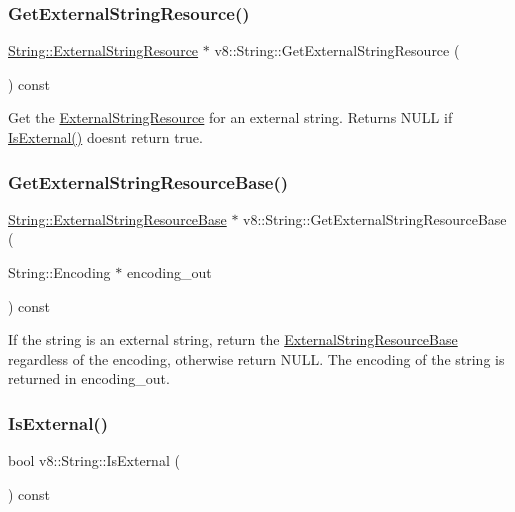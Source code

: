 \subsubsection{\texorpdfstring{Get\+External\+String\+Resource()}{GetExternalStringResource()}}
{\footnotesize\ttfamily \mbox{\hyperlink{classv8_1_1String_1_1ExternalStringResource}{String\+::\+External\+String\+Resource}} $\ast$ v8\+::\+String\+::\+Get\+External\+String\+Resource (\begin{DoxyParamCaption}{ }\end{DoxyParamCaption}) const}

Get the \mbox{\hyperlink{classv8_1_1String_1_1ExternalStringResource}{External\+String\+Resource}} for an external string. Returns N\+U\+LL if \mbox{\hyperlink{classv8_1_1String_a1d24faa97c6168221ec362c395d41ce1}{Is\+External()}} doesn\textquotesingle{}t return true. \mbox{\label{classv8_1_1String_a3031c6406f3f84bbc2d9810477a07489}} 
\subsubsection{\texorpdfstring{Get\+External\+String\+Resource\+Base()}{GetExternalStringResourceBase()}}
{\footnotesize\ttfamily \mbox{\hyperlink{classv8_1_1String_1_1ExternalStringResourceBase}{String\+::\+External\+String\+Resource\+Base}} $\ast$ v8\+::\+String\+::\+Get\+External\+String\+Resource\+Base (\begin{DoxyParamCaption}\item[{String\+::\+Encoding $\ast$}]{encoding\+\_\+out }\end{DoxyParamCaption}) const}

If the string is an external string, return the \mbox{\hyperlink{classv8_1_1String_1_1ExternalStringResourceBase}{External\+String\+Resource\+Base}} regardless of the encoding, otherwise return N\+U\+LL. The encoding of the string is returned in encoding\+\_\+out. \mbox{\label{classv8_1_1String_a1d24faa97c6168221ec362c395d41ce1}} 
\subsubsection{\texorpdfstring{Is\+External()}{IsExternal()}}
{\footnotesize\ttfamily bool v8\+::\+String\+::\+Is\+External (\begin{DoxyParamCaption}{ }\end{DoxyParamCaption}) const}

